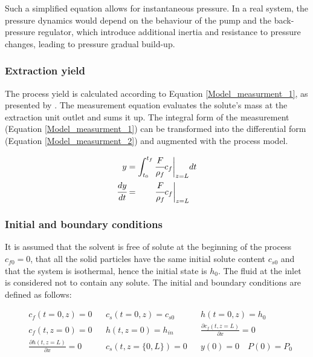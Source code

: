 \documentclass[a4paper,fleqn]{cas-dc}
\begin{document}
	{\color{blue}Such a simplified equation allows for instantaneous pressure. In a real system, the pressure dynamics would depend on the behaviour of the pump and the back-pressure regulator, which introduce additional inertia and resistance to pressure changes, leading to pressure gradual build-up.}
	
	\subsubsection{Extraction yield} \label{CH: Yield}
	
	The process yield is calculated according to Equation \ref{Model_measurment_1}, as presented by \citet{Sovova1994a}. The measurement equation evaluates the solute's mass at the extraction unit outlet and sums it up. The integral form of the measurement (Equation \ref{Model_measurment_1}) can be transformed into the differential form (Equation \ref{Model_measurment_2}) and augmented with the process model.
	
	{\footnotesize
		\begin{align} 
			\label{Model_measurment_1}
			y &= \int_{t_0}^{t_f} \cfrac{F}{\rho_f} c_f \biggr\rvert_{z=L} dt \\
			\cfrac{dy}{dt} &= \qquad \cfrac{F}{\rho_f} c_f \biggr\rvert_{z=L} 
			\label{Model_measurment_2}
	\end{align}	}
	
	\subsubsection{Initial and boundary conditions} 
	It is assumed that the solvent is free of solute at the beginning of the process $c_{f0}=0$, that all the solid particles have the same initial solute content $c_{s0}$ and that the system is isothermal, hence the initial state is $h_0$. The fluid at the inlet is considered not to contain any solute. The initial and boundary conditions are defined as follows:
	
	{\footnotesize
		\begin{align*}
			&c_f(t = 0, z) = 0  && c_s(t = 0, z) = c_{s0} && h(t = 0, z) = h_0 \\
			&c_f(t,   z=0) = 0  && h(t, z=0) = h_{in}  && \frac{\partial c_f(t,z=L)}{\partial x} = 0 \\
			&\frac{\partial h(t,z=L)}{\partial x} = 0   && c_s(t, z=\{0,L\}) = 0 && y(0) = 0 \quad P(0) = P_0 \\
	\end{align*} }
	
\end{document}
